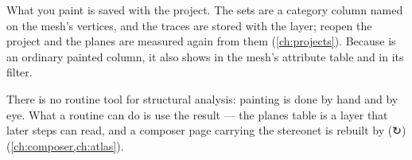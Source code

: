 \begin{note}
What you paint is saved with the project. The sets are a category column named  on the mesh's vertices, and the traces are stored with the layer; reopen the project and the planes are measured again from them (\cref{ch:projects}). Because  is an ordinary painted column, it also shows in the mesh's attribute table and in its filter.
\end{note}

There is no routine tool for structural analysis: painting is done by hand and by eye. What a routine can do is use the result — the planes table is a layer that later steps can read, and a composer page carrying the stereonet is rebuilt by  (↻) (\cref{ch:composer,ch:atlas}).
